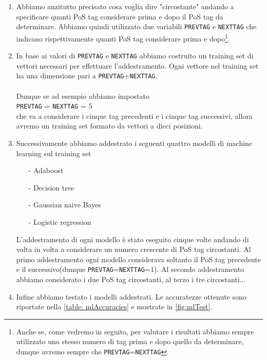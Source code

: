 \documentclass[10pt]{article}
\begin{document}
\begin{enumerate}
	\item Abbiamo anzitutto precisato cosa voglia dire "circostante" andando a specificare quanti PoS tag considerare prima e dopo il PoS tag da determinare. Abbiamo quindi utilizzato due variabili \texttt{PREVTAG} e \texttt{NEXTTAG} che indicano rispettivamente quanti PoS tag considerare prima e dopo\footnote{Anche se, come vedremo in seguito, per valutare i risultati abbiamo sempre utilizzato uno stesso numero di tag prima e dopo quello da determinare, dunque avremo  sempre che \texttt{PREVTAG}=\texttt{NEXTTAG}}.
	
	\item In base ai valori di \texttt{PREVTAG} e \texttt{NEXTTAG} abbiamo costruito un training set di vettori necessari per effettuare l'addestramento. Ogni vettore nel training set ha una dimensione pari a \texttt{PREVTAG}$+$\texttt{NEXTTAG}.\\
	\\
	Dunque se ad esempio abbiamo impostato\\
	\texttt{PREVTAG} = \texttt{NEXTTAG} = 5\\
	che va a considerare i cinque tag precedenti e i cinque tag successivi,	allora avremo un training set formato da vettori a dieci posizioni.
	
	\item Successivamente abbiamo addestrato i seguenti quattro modelli di machine learning sul training set
	\begin{itemize}
		\item[-] Adaboost
		\item[-] Decision tree
		\item[-] Gaussian naive Bayes
		\item[-] Logistic regression
	\end{itemize}
	L'addestramento di ogni modello è stato eseguito cinque volte andando di volta in volta a considerare un numero crescente di PoS tag circostanti. Al primo addestramento ogni modello considerava soltanto il PoS tag precedente e il successivo(dunque \texttt{PREVTAG}=\texttt{NEXTTAG}=1). Al secondo addestramento abbiamo considerato i due PoS tag circostanti, al terzo i tre circostanti$\ldots$
	
	\item Infine abbiamo testato i modelli addestrati. Le accuratezze ottenute sono riportate nella \autoref{table: mlAccuracies} e mostrate in \autoref{fig:mlTest}.
	

\end{enumerate}
\end{document}
